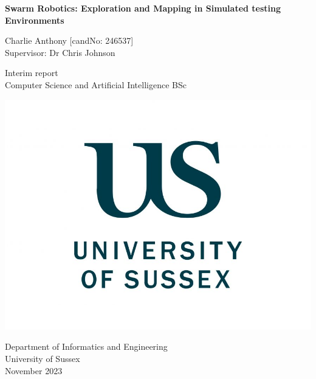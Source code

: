 \documentclass[12pt]{article}
\begin{document}
\begin{titlepage}
    \centering
    \vspace*{5cm}

    \Large
    \textbf{Swarm Robotics: Exploration and Mapping in Simulated testing Environments}

    \vspace{1cm}

    Charlie Anthony [candNo: 246537]\\
    Supervisor: Dr Chris Johnson

    \vfill

    \vspace{1cm}

    \small
    Interim report\\
    Computer Science and Artificial Intelligence BSc

    \includegraphics[width=0.3\linewidth]{sussex_logo.jpg} %


    \small
    Department of Informatics and Engineering\\
    University of Sussex\\
    November 2023
\end{titlepage}

\tableofcontents
\newpage

\end{document}
